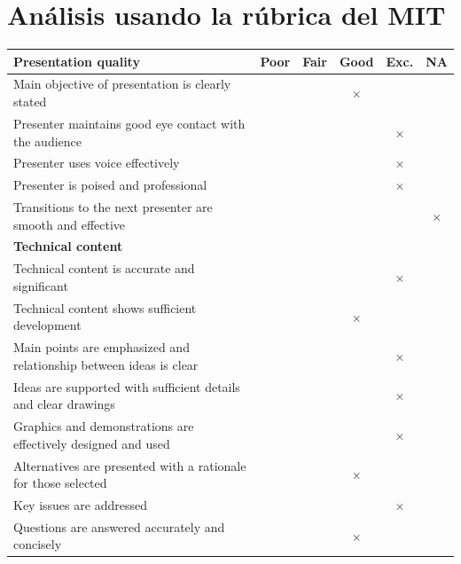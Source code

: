 \documentclass[spanish, fleqn]{article}
\let\b\textbf
\newcommand{\x}{$\times$}
\begin{document}
\section{Análisis usando la rúbrica del MIT}
\begin{table}[h!]\centering\begin{tabular}{|l|c|c|c|c|c|} \hline
    \b{Presentation quality} &\b{Poor} &\b{Fair} &\b{Good} &\b{Exc.}&\b{NA}
                                                                     \\ \hline
    Main objective of presentation is clearly stated       & & & \x & &\\ \hline
    Presenter maintains good eye contact with the audience & & & & \x &\\ \hline
    Presenter uses voice effectively                       & & & & \x & \\ \hline
    Presenter is poised and professional                   & & & & \x & \\ \hline
    Transitions to the next presenter are smooth and effective 
                                                           & & & & & \x \\ \hline
    \b{Technical content} & & & & & \\ \hline
    Technical content is accurate and significant          & & & & \x & \\ \hline
    Technical content shows sufficient development         & & & \x & & \\ \hline
    Main points are emphasized and relationship between ideas is clear
                                                           & & & & \x & \\ \hline
    Ideas are supported with sufficient details and clear drawings
                                                           & & & & \x & \\ \hline
    Graphics and demonstrations are effectively designed and used
                                                           & & & & \x & \\ \hline
    Alternatives are presented with a rationale for those selected
                                                           & & & \x & & \\ \hline
    Key issues are addressed                               & & & & \x & \\ \hline
    Questions are answered accurately and concisely        & & & \x & & \\ \hline
\end{tabular}\end{table}
\end{document}
